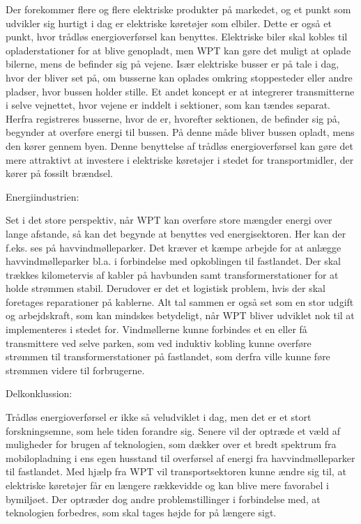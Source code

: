 Der forekommer flere og flere elektriske produkter på markedet, og et punkt som udvikler sig hurtigt i dag er elektriske køretøjer som elbiler. Dette er også et punkt, hvor trådløs energioverførsel kan benyttes. Elektriske biler skal kobles til opladerstationer for at blive genopladt, men WPT kan gøre det muligt at oplade bilerne, mens de befinder sig på vejene. Især elektriske busser er på tale i dag, hvor der bliver set på, om busserne kan oplades omkring stoppesteder eller andre pladser, hvor bussen holder stille. Et andet koncept er at integrerer transmitterne i selve vejnettet, hvor vejene er inddelt i sektioner, som kan tændes separat. Herfra registreres busserne, hvor de er, hvorefter sektionen, de befinder sig på, begynder at overføre energi til bussen. På denne måde bliver bussen opladt, mens den kører gennem byen. Denne benyttelse af trådløs energioverførsel kan gøre det mere attraktivt at investere i elektriske køretøjer i stedet for transportmidler, der kører på fossilt brændsel.
 	
Energiindustrien:
 	
Set i det store perspektiv, når WPT kan overføre store mængder energi over lange afstande, så kan det begynde at benyttes ved energisektoren. Her kan der f.eks. ses på havvindmølleparker. Det kræver et kæmpe arbejde for at anlægge havvindmølleparker bl.a. i forbindelse med opkoblingen til fastlandet. Der skal trækkes kilometervis af kabler på havbunden samt transformerstationer for at holde strømmen stabil. Derudover er det et logistisk problem, hvis der skal foretages reparationer på kablerne. Alt tal sammen er også set som en stor udgift og arbejdskraft, som kan mindskes betydeligt, når WPT bliver udviklet nok til at implementeres i stedet for. Vindmøllerne kunne forbindes et en eller få transmittere ved selve parken, som ved induktiv kobling kunne overføre strømmen til transformerstationer på fastlandet, som derfra ville kunne føre strømmen videre til forbrugerne.

Delkonklussion:

Trådløs energioverførsel er ikke så veludviklet i dag, men det er et stort forskningsemne, som hele tiden forandre sig. Senere vil der optræde et væld af muligheder for brugen af teknologien, som dækker over et bredt spektrum fra mobilopladning i ens egen husstand til overførsel af energi fra havvindmølleparker til fastlandet. Med hjælp fra WPT vil transportsektoren kunne ændre sig til, at elektriske køretøjer får en længere rækkevidde og kan blive mere favorabel i bymiljøet. Der optræder dog andre problemstillinger i forbindelse med, at teknologien forbedres, som skal tages højde for på længere sigt.